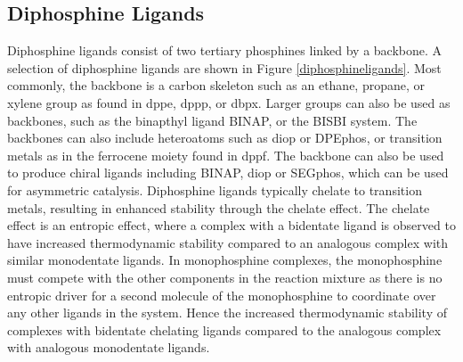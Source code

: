 
\subsection{Diphosphine Ligands}

Diphosphine ligands consist of two tertiary phosphines linked by a backbone.  A selection of diphosphine ligands are shown in Figure \ref{diphosphineligands}.  Most commonly, the backbone is a carbon skeleton such as an ethane, propane, or xylene group as found in \acrshort{dppe}, \acrshort{dppp}, or \acrshort{dbpx}.  Larger groups can also be used as backbones, such as the binapthyl ligand \acrshort{BINAP}, or the \acrshort{BISBI} system.  The backbones can also include heteroatoms such as \acrshort{diop} or \acrshort{DPEphos}, or transition metals as in the ferrocene moiety found in \acrshort{dppf}.  The backbone can also be used to produce chiral ligands including \acrshort{BINAP}, \acrshort{diop} or \acrshort{SEGphos}, which can be used for asymmetric catalysis.\cite{Noyori2002, Agbossou1995, Shimizu2007}  Diphosphine ligands typically chelate to transition metals, resulting in enhanced stability through the chelate effect.  The chelate effect is an entropic effect, where a complex with a bidentate ligand is observed to have increased thermodynamic stability compared to an analogous complex with similar monodentate ligands.\cite{Housecroft2005}  In monophosphine complexes, the monophosphine must compete with the other components in the reaction mixture as there is no entropic driver for a second molecule of the monophosphine to coordinate over any other ligands in the system.  Hence the increased thermodynamic stability of complexes with bidentate chelating ligands compared to the analogous complex with analogous monodentate ligands.  

